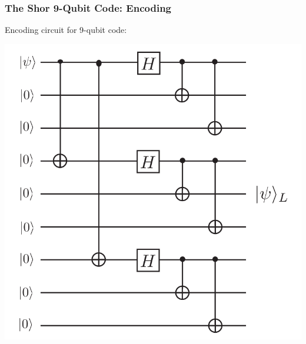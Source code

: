 \documentclass{beamer}
\begin{document}


\begin{frame}
    \frametitle{The Shor 9-Qubit Code: Encoding}
        Encoding circuit for 9-qubit code:
        
        \begin{center}
        \includegraphics[scale=0.7]{9qbencoding.PNG}
        \end{center}
\end{frame}
\end{document}
